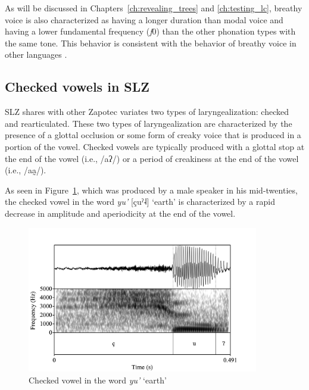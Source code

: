 As will be discussed in Chapters~\ref{ch:revealing_trees} and \ref{ch:testing_lc}, breathy voice is also characterized as having a longer duration than modal voice and having a lower fundamental frequency (\textit{f}0) than the other phonation types with the same tone. This behavior is consistent with the behavior of breathy voice in other languages \citep[e.g.,][]{blankenshipTimeCourseBreathiness1997,brunelleDialectExperiencePerceptual2012,brunelleTonePhonationSoutheast2016,hillenbrandAcousticCorrelatesBreathy1996}.

\subsection{Checked vowels in SLZ} \label{sec:SLZ-voicequality-checked}
SLZ shares with other Zapotec variates two types of laryngealization: checked and rearticulated. These two types of laryngealization are characterized by the presence of a glottal occlusion or some form of creaky voice that is produced in a portion of the vowel. Checked vowels are typically produced with a glottal stop at the end of the vowel (i.e., /aʔ/) or a period of creakiness at the end of the vowel (i.e., /aa̰/). 

As seen in Figure~\ref{fig:CheckedVowel}, which was produced by a male speaker in his mid-twenties, the checked vowel in the word \textit{yu'} [çuˀ˨] `earth' is characterized by a rapid decrease in amplitude and aperiodicity at the end of the vowel. 

\begin{figure}[h!]
    \centering
    \includegraphics[width=0.9\textwidth]{images/Spectrograms/RD_yu'.png}
    \caption{Checked vowel in the word \textit{yu'} `earth'}
    \label{fig:CheckedVowel}
\end{figure}

